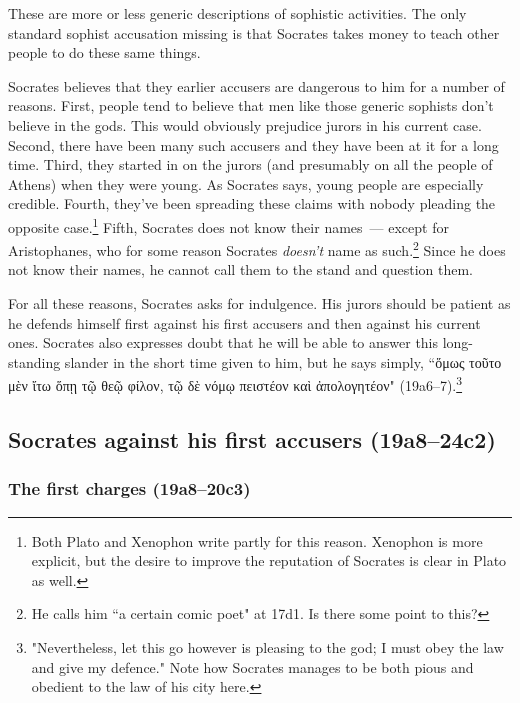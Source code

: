 \documentclass[11pt]{article}
\begin{document}
These are more or less generic descriptions of sophistic activities.  The only standard sophist accusation missing is that Socrates takes money to teach other people to do these same things.

Socrates believes that they earlier accusers are dangerous to him for a number of reasons.  First, people tend to believe that men like those generic sophists don't believe in the gods.  This would obviously prejudice jurors in his current case.  Second, there have been many such accusers and they have been at it for a long time.  Third, they started in on the jurors (and presumably on all the people of Athens) when they were young.  As Socrates says, young people are especially credible.  Fourth, they've been spreading these claims with nobody pleading the opposite case.\footnote{Both Plato and Xenophon write partly for this reason.  Xenophon is more explicit, but the desire to improve the reputation of Socrates is clear in Plato as well.}  Fifth, Socrates does not know their names~--- except for Aristophanes, who for some reason Socrates \emph{doesn't} name as such.\footnote{He calls him ``a certain comic poet" at 17d1.  Is there some point to this?}  Since he does not know their names, he cannot call them to the stand and question them.

For all these reasons, Socrates asks for indulgence.  His jurors should be patient as he defends himself first against his first accusers and then against his current ones.  Socrates also expresses doubt that he will be able to answer this long-standing slander in the short time given to him, but he says simply, ``{\g ὅμως τοῦτο μὲν ἴτω ὅπῃ τῷ θεῷ φίλον, τῷ δὲ νόμῳ πειστέον καὶ ἀπολογητέον}" (19a6--7).\footnote{"Nevertheless, let this go however is pleasing to the god; I must obey the law and give my defence." Note how Socrates manages to be both pious and obedient to the law of his city here.}


\subsection{Socrates against his first accusers (19a8--24c2)}

\subsubsection{The first charges (19a8--20c3)}
\end{document}
